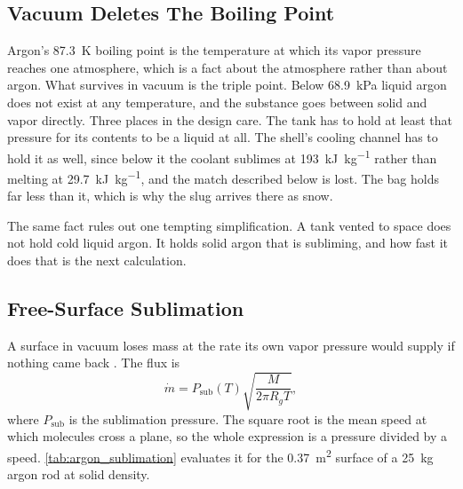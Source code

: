 \documentclass{article}
\begin{document}
\subsection*{Vacuum Deletes The Boiling Point}
Argon's \SI{87.3}{\kelvin} boiling point is the temperature at which its vapor pressure reaches one atmosphere, which is a fact about the atmosphere rather than about argon. What survives in vacuum is the triple point. Below \SI{68.9}{\kilo\pascal} liquid argon does not exist at any temperature, and the substance goes between solid and vapor directly. Three places in the design care. The tank has to hold at least that pressure for its contents to be a liquid at all. The shell's cooling channel has to hold it as well, since below it the coolant sublimes at \SI{193}{\kilo\joule\per\kilogram} rather than melting at \SI{29.7}{\kilo\joule\per\kilogram}, and the match described below is lost. The bag holds far less than it, which is why the slug arrives there as snow.

The same fact rules out one tempting simplification. A tank vented to space does not hold cold liquid argon. It holds solid argon that is subliming, and how fast it does that is the next calculation.

\subsection*{Free-Surface Sublimation}
A surface in vacuum loses mass at the rate its own vapor pressure would supply if nothing came back \cite{knudsen1915verdampfung}. The flux is
\begin{equation}\label{eq:hertz_knudsen}
\dot{m} = P_{\mathrm{sub}}(T)\sqrt{\frac{M}{2\pi R_g T}},
\end{equation}
where $P_{\mathrm{sub}}$ is the sublimation pressure. The square root is the mean speed at which molecules cross a plane, so the whole expression is a pressure divided by a speed. \autoref{tab:argon_sublimation} evaluates it for the \SI{0.37}{\square\meter} surface of a \SI{25}{\kilogram} argon rod at solid density.
\end{document}
